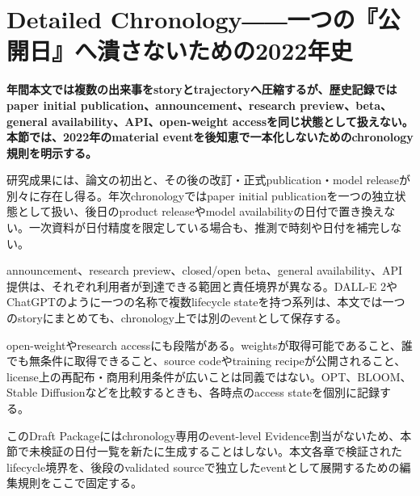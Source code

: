 \section{Detailed Chronology――一つの『公開日』へ潰さないための2022年史}
\label{pkg:annual-chronology}
\noindent\textbf{年間本文では複数の出来事をstoryとtrajectoryへ圧縮するが、歴史記録ではpaper initial publication、announcement、research preview、beta、general availability、API、open-weight accessを同じ状態として扱えない。本節では、2022年のmaterial eventを後知恵で一本化しないためのchronology規則を明示する。}

研究成果には、論文の初出と、その後の改訂・正式publication・model releaseが別々に存在し得る。年次chronologyではpaper initial publicationを一つの独立状態として扱い、後日のproduct releaseやmodel availabilityの日付で置き換えない。一次資料が日付精度を限定している場合も、推測で時刻や日付を補完しない。


announcement、research preview、closed/open beta、general availability、API提供は、それぞれ利用者が到達できる範囲と責任境界が異なる。DALL-E 2やChatGPTのように一つの名称で複数lifecycle stateを持つ系列は、本文では一つのstoryにまとめても、chronology上では別のeventとして保存する。


open-weightやresearch accessにも段階がある。weightsが取得可能であること、誰でも無条件に取得できること、source codeやtraining recipeが公開されること、license上の再配布・商用利用条件が広いことは同義ではない。OPT、BLOOM、Stable Diffusionなどを比較するときも、各時点のaccess stateを個別に記録する。


このDraft Packageにはchronology専用のevent-level Evidence割当がないため、本節で未検証の日付一覧を新たに生成することはしない。本文各章で検証されたlifecycle境界を、後段のvalidated sourceで独立したeventとして展開するための編集規則をここで固定する。
